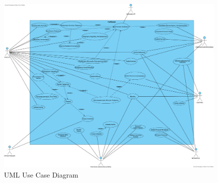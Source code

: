\documentclass{../ol-softwaremanual}
\begin{document}
	\begin{figure}[htbp!]
		\includegraphics[scale=0.23]{img/use_case_diagramm.png}
		\caption{\en UML Use Case Diagram \gr}
	\end{figure}
	
\end{document}
